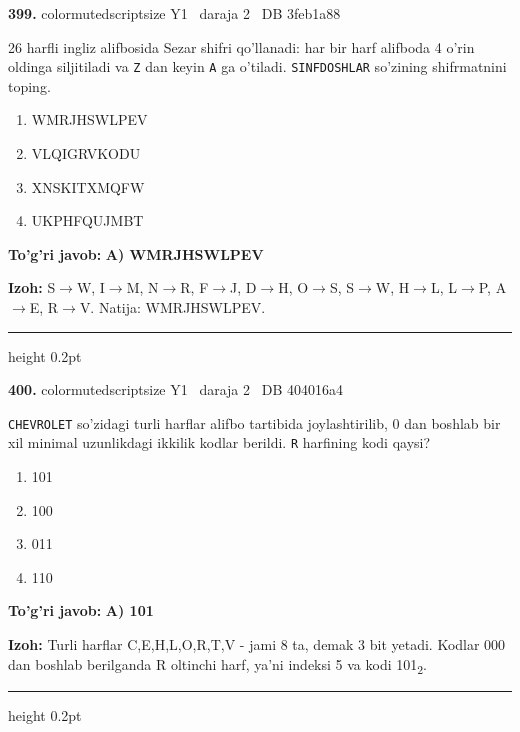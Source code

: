 \documentclass[10pt,a4paper,oneside]{article}
\begin{document}
\noindent\textbf{\color{ink}399.}  {color{muted}scriptsize Y1 \textbullet\ daraja 2 \textbullet\ DB 3feb1a88}
\par
26 harfli ingliz alifbosida Sezar shifri qo'llanadi: har bir harf alifboda 4 o'rin oldinga siljitiladi va \texttt{Z} dan keyin \texttt{A} ga o'tiladi. \texttt{SINFDOSHLAR} so'zining shifrmatnini toping.
\begin{enumerate}[label=\Alph*),leftmargin=9mm]
\item WMRJHSWLPEV
\item VLQIGRVKODU
\item XNSKITXMQFW
\item UKPHFQUJMBT
\end{enumerate}
\begin{tcolorbox}[enhanced,breakable,colback=teal!4,colframe=teal!50!black,boxrule=0.5pt,arc=1.1mm,left=3mm,right=3mm,top=1.7mm,bottom=1.7mm,before skip=2mm,after skip=2mm]
\textbf{\color{teal}To'g'ri javob:} \textbf{A) WMRJHSWLPEV}
\par\smallskip
\textbf{Izoh:} S\ensuremath{\to}W, I\ensuremath{\to}M, N\ensuremath{\to}R, F\ensuremath{\to}J, D\ensuremath{\to}H, O\ensuremath{\to}S, S\ensuremath{\to}W, H\ensuremath{\to}L, L\ensuremath{\to}P, A\ensuremath{\to}E, R\ensuremath{\to}V. Natija: WMRJHSWLPEV.
\end{tcolorbox}
\vspace{2mm}\hrule height 0.2pt \vspace{3mm}

\noindent\textbf{\color{ink}400.}  {color{muted}scriptsize Y1 \textbullet\ daraja 2 \textbullet\ DB 404016a4}
\par
\texttt{CHEVROLET} so'zidagi turli harflar alifbo tartibida joylashtirilib, 0 dan boshlab bir xil minimal uzunlikdagi ikkilik kodlar berildi. \texttt{R} harfining kodi qaysi?
\begin{enumerate}[label=\Alph*),leftmargin=9mm]
\item 101
\item 100
\item 011
\item 110
\end{enumerate}
\begin{tcolorbox}[enhanced,breakable,colback=teal!4,colframe=teal!50!black,boxrule=0.5pt,arc=1.1mm,left=3mm,right=3mm,top=1.7mm,bottom=1.7mm,before skip=2mm,after skip=2mm]
\textbf{\color{teal}To'g'ri javob:} \textbf{A) 101}
\par\smallskip
\textbf{Izoh:} Turli harflar C,E,H,L,O,R,T,V - jami 8 ta, demak 3 bit yetadi. Kodlar 000 dan boshlab berilganda R oltinchi harf, ya'ni indeksi 5 va kodi 101\textsubscript{2}.
\end{tcolorbox}
\vspace{2mm}\hrule height 0.2pt \vspace{3mm}
\end{document}
